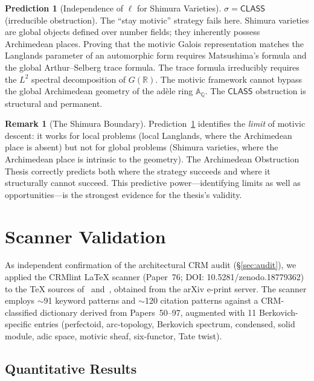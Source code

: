 \documentclass[11pt,a4paper]{article}
\theoremstyle{plain}
\theoremstyle{definition}
\newtheorem{remark}[theorem]{Remark}
\newtheorem{prediction}[theorem]{Prediction}
\newcommand{\CLASS}{\textsf{CLASS}}
\newcommand{\Q}{\mathbb{Q}}
\newcommand{\R}{\mathbb{R}}
\newcommand{\A}{\mathbb{A}}
\newcommand{\sig}{\sigma}
\begin{document}
\begin{prediction}[Independence of $\ell$ for Shimura Varieties]\label{pred:shimura}
$\sig = \CLASS$ (irreducible obstruction). The ``stay motivic'' strategy fails here. Shimura varieties are global objects defined over number fields; they inherently possess Archimedean places. Proving that the motivic Galois representation matches the Langlands parameter of an automorphic form requires Matsushima's formula and the global Arthur--Selberg trace formula. The trace formula irreducibly requires the $L^2$ spectral decomposition of $G(\R)$. The motivic framework cannot bypass the global Archimedean geometry of the ad\`ele ring $\A_\Q$. The $\CLASS$ obstruction is structural and permanent.
\end{prediction}

\begin{remark}[The Shimura Boundary]
Prediction~\ref{pred:shimura} identifies the \emph{limit} of motivic descent: it works for local problems (local Langlands, where the Archimedean place is absent) but not for global problems (Shimura varieties, where the Archimedean place is intrinsic to the geometry). The Archimedean Obstruction Thesis correctly predicts both where the strategy succeeds and where it structurally cannot succeed. This predictive power---identifying limits as well as opportunities---is the strongest evidence for the thesis's validity.
\end{remark}


\section{Scanner Validation}\label{sec:scanner}

As independent confirmation of the architectural CRM audit (\S\ref{sec:audit}), we applied the CRMlint LaTeX scanner (Paper~76; DOI: 10.5281/zenodo.18779362) to the \TeX{} sources of~\cite{scholze-berkovich} and~\cite{scholze-motivic-geometrization}, obtained from the arXiv e-print server. The scanner employs $\sim$91 keyword patterns and $\sim$120 citation patterns against a CRM-classified dictionary derived from Papers~50--97, augmented with 11 Berkovich-specific entries (perfectoid, arc-topology, Berkovich spectrum, condensed, solid module, adic space, motivic sheaf, six-functor, Tate twist).

\subsection{Quantitative Results}
\end{document}
